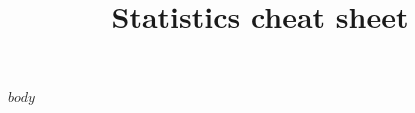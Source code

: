 \documentclass[a4paper,landscape]{article}
\title{Statistics cheat sheet}
\begin{document}
\footnotesize

$body$
\end{document}
